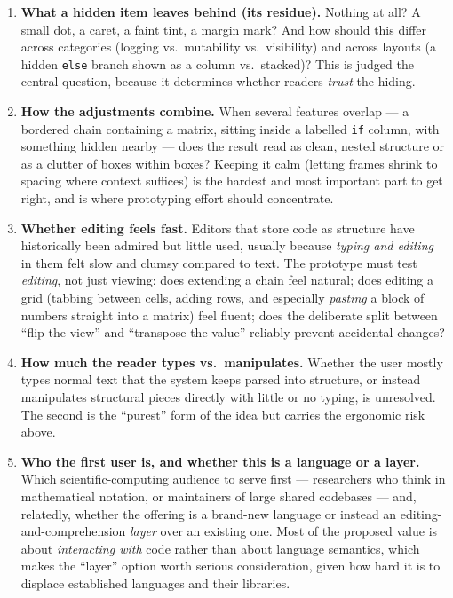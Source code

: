 \documentclass[11pt]{article}
\newcommand{\req}[1]{\textbf{\color{accent}#1}}
\begin{document}
\begin{enumerate}[leftmargin=1.6em,itemsep=5pt]
  \item \req{What a hidden item leaves behind (its residue).} Nothing at all? A small dot, a caret, a faint tint, a margin mark? And how should this differ across categories (logging vs.\ mutability vs.\ visibility) and across layouts (a hidden \texttt{else} branch shown as a column vs.\ stacked)? This is judged the central question, because it determines whether readers \emph{trust} the hiding.
  \item \req{How the adjustments combine.} When several features overlap --- a bordered chain containing a matrix, sitting inside a labelled \texttt{if} column, with something hidden nearby --- does the result read as clean, nested structure or as a clutter of boxes within boxes? Keeping it calm (letting frames shrink to spacing where context suffices) is the hardest and most important part to get right, and is where prototyping effort should concentrate.
  \item \req{Whether editing feels fast.} Editors that store code as structure have historically been admired but little used, usually because \emph{typing and editing} in them felt slow and clumsy compared to text. The prototype must test \emph{editing}, not just viewing: does extending a chain feel natural; does editing a grid (tabbing between cells, adding rows, and especially \emph{pasting} a block of numbers straight into a matrix) feel fluent; does the deliberate split between ``flip the view'' and ``transpose the value'' reliably prevent accidental changes?
  \item \req{How much the reader types vs.\ manipulates.} Whether the user mostly types normal text that the system keeps parsed into structure, or instead manipulates structural pieces directly with little or no typing, is unresolved. The second is the ``purest'' form of the idea but carries the ergonomic risk above.
  \item \req{Who the first user is, and whether this is a language or a layer.} Which scientific-computing audience to serve first --- researchers who think in mathematical notation, or maintainers of large shared codebases --- and, relatedly, whether the offering is a brand-new language or instead an editing-and-comprehension \emph{layer} over an existing one. Most of the proposed value is about \emph{interacting with} code rather than about language semantics, which makes the ``layer'' option worth serious consideration, given how hard it is to displace established languages and their libraries.

\end{enumerate}
\end{document}
